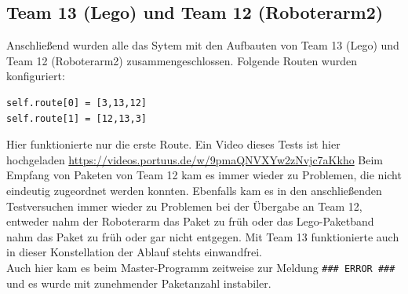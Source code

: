 \subsection{Team 13 (Lego) und Team 12 (Roboterarm2)}

Anschließend wurden alle das Sytem mit den Aufbauten von Team 13 (Lego) und Team 12 (Roboterarm2) zusammengeschlossen. Folgende Routen wurden konfiguriert:

\begin{lstlisting}[style=CBlank]
self.route[0] = [3,13,12] 
self.route[1] = [12,13,3]
\end{lstlisting}

\noindent Hier funktionierte nur die erste Route. Ein Video dieses Tests ist hier hochgeladen \url{https://videos.portuus.de/w/9pmaQNVXYw2zNvjc7aKkho} Beim Empfang von Paketen von Team 12 kam es immer wieder zu Problemen, die nicht eindeutig zugeordnet werden konnten. 
Ebenfalls kam es in den anschließenden Testversuchen immer wieder zu Problemen bei der Übergabe an Team 12, entweder nahm der Roboterarm das Paket zu früh oder das Lego-Paketband nahm das Paket zu früh oder gar nicht entgegen. Mit Team 13 funktionierte auch in dieser Konstellation der Ablauf stehts einwandfrei. \\
Auch hier kam es beim Master-Programm zeitweise zur Meldung \texttt{\#\#\# ERROR \#\#\#} und es wurde mit zunehmender Paketanzahl instabiler.
